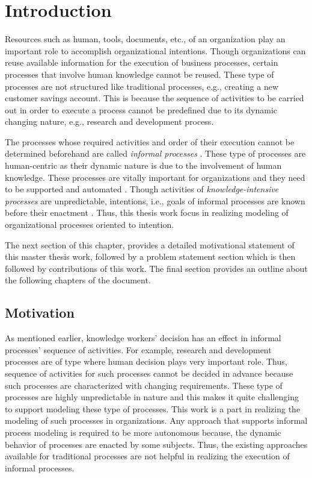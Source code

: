\chapter{Introduction}
\label{chap:introduction}

Resources such as human, tools, documents, etc., of an organization play an important role to accomplish organizational intentions. Though organizations can reuse available information for the execution of business processes, certain processes that involve human knowledge cannot be reused. These type of processes are not structured like traditional processes, e.g., creating a new customer savings account. This is because the sequence of activities to be carried out in order to execute a process cannot be predefined due to its dynamic changing nature, e.g., research and development process.

The processes whose required activities and order of their execution cannot be determined beforehand are called \textit{informal processes} \cite{Sungur2014}. These type of processes are human-centric as their dynamic nature is due to the involvement of human knowledge. These processes are vitally important for organizations and they need to be supported and automated \cite{Sungur2014a}. Though activities of \textit{knowledge-intensive processes} are unpredictable, intentions, i.e., goals of informal processes are known before their enactment \cite{DiCiccio2015}. Thus, this thesis work focus in realizing modeling of organizational processes oriented to intention. 

The next section of this chapter, provides a detailed motivational statement of this master thesis work, followed by a problem statement section which is then followed by contributions of this work. The final section provides an outline about the following chapters of the document. 

\section{Motivation}
\label{sec:motivation}
As mentioned earlier, knowledge workers' decision has an effect in informal processes' sequence of activities. For example, research and development processes are of type where human decision plays very important role. Thus, sequence of activities for such processes cannot be decided in advance because such processes are characterized with changing requirements. These type of processes are highly unpredictable in nature and this makes it quite challenging to support modeling these type of processes. This work is a part in realizing the modeling of such processes in organizations. Any approach that supports informal process modeling is required to be more autonomous because, the dynamic behavior of processes are enacted by some subjects. Thus, the existing approaches available for traditional processes are not helpful in realizing the execution of informal processes.  

